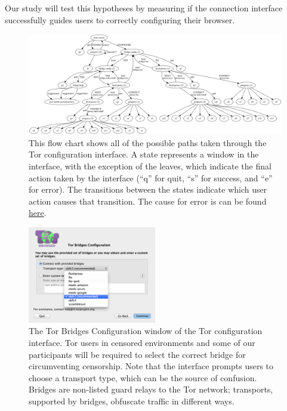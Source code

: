 \documentclass{template}
\begin{document}
Our study will test this hypotheses by measuring if the connection
interface successfully guides users to correctly configuring their browser.\\

\begin{figure}[t]
\label{fig:interface}
  \centering
    \includegraphics[width=\textwidth]{../torconfig.png}
    \caption{This flow chart shows all of the possible paths taken through the
    Tor configuration interface. A state represents a window in the interface,
    with the exception of the leaves, which indicate the final action taken by
    the interface (``q'' for quit, ``s'' for success, and ``e'' for error). The
    transitions between the states indicate which user action causes that
    transition. The cause for error is can be found
\href{https://github.com/lindanlee/circumvention-ux-tor/blob/master/torconfig.dot}{here}.}
\end{figure}

\begin{figure}[t]
\label{fig:bridges}
  \centering
    \includegraphics[width=0.5\textwidth]{configuration-screenshot.png}
    \caption{The Tor Bridges Configuration window of the Tor configuration
    interface. Tor users in censored environments and some of our participants
    will be required to select the correct bridge for circumventing censorship.
    Note that the interface prompts users to choose a transport type, which can be
    the source of confusion. Bridges are non-listed guard relays to the Tor
    network; transports, supported by bridges, obfuscate traffic in
    different ways.}
\end{figure}
\end{document}
